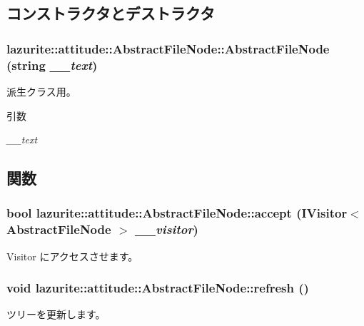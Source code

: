 \subsection{コンストラクタとデストラクタ}
\hypertarget{classlazurite_1_1attitude_1_1_abstract_file_node_a4c5fd784fdd09f1c3c6bdbe7c3a4f89c}{
\subsubsection[{AbstractFileNode}]{\setlength{\rightskip}{0pt plus 5cm}lazurite::attitude::AbstractFileNode::AbstractFileNode (string {\em \_\-\_\-text})}}
\label{classlazurite_1_1attitude_1_1_abstract_file_node_a4c5fd784fdd09f1c3c6bdbe7c3a4f89c}


派生クラス用。 
\begin{DoxyParams}{引数}
\item[{\em \_\-\_\-text}]\end{DoxyParams}


\subsection{関数}
\hypertarget{classlazurite_1_1attitude_1_1_abstract_file_node_a7360df3ccc00eedf89304d32666f6fa6}{
\subsubsection[{accept}]{\setlength{\rightskip}{0pt plus 5cm}bool lazurite::attitude::AbstractFileNode::accept ({\bf IVisitor}$<$ {\bf AbstractFileNode} $>$ {\em \_\-\_\-visitor})}}
\label{classlazurite_1_1attitude_1_1_abstract_file_node_a7360df3ccc00eedf89304d32666f6fa6}
Visitor にアクセスさせます。 \hypertarget{classlazurite_1_1attitude_1_1_abstract_file_node_a78558f5a5aa0b91f8f084fcada9c9e75}{
\subsubsection[{refresh}]{\setlength{\rightskip}{0pt plus 5cm}void lazurite::attitude::AbstractFileNode::refresh ()}}
\label{classlazurite_1_1attitude_1_1_abstract_file_node_a78558f5a5aa0b91f8f084fcada9c9e75}
ツリーを更新します。 


